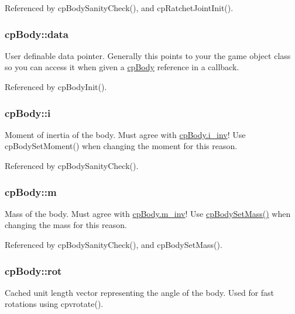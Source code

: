Referenced by cp\-Body\-Sanity\-Check(), and cp\-Ratchet\-Joint\-Init().

\hypertarget{structcp_body_a19fd1216b31f6778e90aa42f0a6322d5}{
\subsubsection[{data}]{ {\bf cp\-Body\-::data}}}\label{structcp_body_a19fd1216b31f6778e90aa42f0a6322d5}
User definable data pointer. Generally this points to your the game object class so you can access it when given a \hyperlink{structcp_body}{cp\-Body} reference in a callback. 

Referenced by cp\-Body\-Init().

\hypertarget{structcp_body_a4a47d0b30594a5fe28dd4de3cdf1450a}{
\subsubsection[{i}]{ {\bf cp\-Body\-::i}}}\label{structcp_body_a4a47d0b30594a5fe28dd4de3cdf1450a}
Moment of inertia of the body. Must agree with \hyperlink{structcp_body_a36b73e662173a240d1d8f09cdd468202}{cp\-Body.\-i\-\_\-inv}! Use cp\-Body\-Set\-Moment() when changing the moment for this reason. 

Referenced by cp\-Body\-Sanity\-Check().

\hypertarget{structcp_body_a883298164e53e4633b3daa4de92a9831}{
\subsubsection[{m}]{ {\bf cp\-Body\-::m}}}\label{structcp_body_a883298164e53e4633b3daa4de92a9831}
Mass of the body. Must agree with \hyperlink{structcp_body_a204a010e411c0f67e511a69f23d02025}{cp\-Body.\-m\-\_\-inv}! Use \hyperlink{group__cp_body_gab9c94b87111398a5968f4ce7e94e7ff9}{cp\-Body\-Set\-Mass()} when changing the mass for this reason. 

Referenced by cp\-Body\-Sanity\-Check(), and cp\-Body\-Set\-Mass().

\hypertarget{structcp_body_a9ef833e4f67586894e497dbdc7f499ec}{
\subsubsection[{rot}]{ {\bf cp\-Body\-::rot}}}\label{structcp_body_a9ef833e4f67586894e497dbdc7f499ec}
Cached unit length vector representing the angle of the body. Used for fast rotations using cpvrotate(). 

